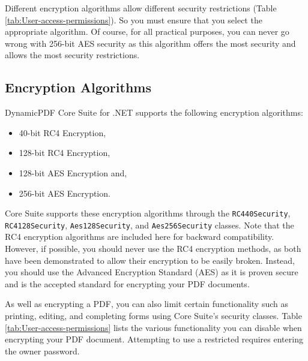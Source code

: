 \documentclass[american]{tufte-book}
\numberwithin{equation}{section}
\numberwithin{figure}{section}
\begin{document}
{Different encryption algorithms allow different security restrictions
(Table \ref{tab:User-access-permissions}). So you must ensure that you select the appropriate algorithm. Of course, for all practical purposes,
you can never go wrong with 256-bit AES security as this algorithm offers the most security and allows the most
security restrictions.

\subsection{Encryption Algorithms}

DynamicPDF Core Suite for .NET supports the following encryption
algorithms:
\begin{itemize}
\item 40-bit RC4 Encryption,
\item 128-bit RC4 Encryption,
\item 128-bit AES Encryption and,
\item 256-bit AES Encryption.
\end{itemize}
Core Suite supports these encryption algorithms through the \texttt{RC440Security},
\texttt{RC4128Security}, \texttt{Aes128Security}, and \texttt{Aes256Security}
classes. Note that the RC4 encryption algorithms are included here
for backward compatibility. However, if possible, you should never
use the RC4 encryption methods, as both have been demonstrated to
allow their encryption to be easily broken. Instead, you should use
the Advanced Encryption Standard (AES) as it is proven secure and
is the accepted standard for encrypting your PDF documents. 

As well as encrypting a PDF, you can also limit certain functionality
such as printing, editing, and completing forms using Core Suite's
security classes. Table \ref{tab:User-access-permissions} lists the
various functionality you can disable when encrypting your PDF document.
Attempting to use a restricted requires entering the owner password.

}
\end{document}

